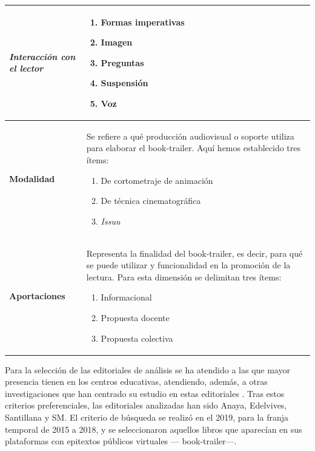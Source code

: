 \documentclass[spanish]{textolivre}
\begin{document}
\begin{table}[h!]
\begin{threeparttable}
\begin{tabular}{p{}p{}}
\emph{Interacción con el lector} &
\vspace{-0.6\baselineskip}
\begin{enumerate}[resume*=table,nosep,partopsep=0pt,topsep=0pt,parsep=0pt]
    \item \label{itm15} Formas imperativas
    \item \label{itm16} Imagen
    \item \label{itm17} Preguntas 
    \item \label{itm18} Suspensión
    \item \label{itm19} Voz
\end{enumerate}
\\

\midrule 
\textbf{Modalidad} &
Se refiere a qué producción audiovisual o soporte utiliza para elaborar el book-trailer. Aquí hemos establecido tres ítems: 
\begin{enumerate}[resume*=table,nosep,partopsep=0pt,topsep=0pt,parsep=0pt]
   \item\label{itm20} De cortometraje de animación
   \item\label{itm21} De técnica cinematográfica
   \item\label{itm22} \emph{Issuu}
\end{enumerate}
\\
\midrule
\textbf{Aportaciones} &
Representa la finalidad del book-trailer, es decir, para qué se puede utilizar y funcionalidad en la promoción de la lectura. Para esta dimensión se delimitan tres ítems:
\begin{enumerate}[resume*=table]
   \item\label{itm23} Informacional
   \item\label{itm24} Propuesta docente
   \item\label{itm25} Propuesta colectiva
\end{enumerate}
\\
\bottomrule
\end{tabular}
\end{threeparttable}
\end{table}


Para la selección de las editoriales de análisis se ha atendido a las que mayor presencia tienen en los centros educativas, atendiendo, además, a otras investigaciones que han centrado su estudio en estas editoriales \cite{ballesteros2022literatura, fernandez2006valores}. Tras estos criterios preferenciales, las editoriales analizadas han sido Anaya, Edelvives, Santillana y SM. El criterio de búsqueda se realizó en el 2019, para la franja temporal de 2015 a 2018, y se seleccionaron aquellos libros que aparecían en sus plataformas con epitextos públicos virtuales — book-trailer—.
\end{document}

